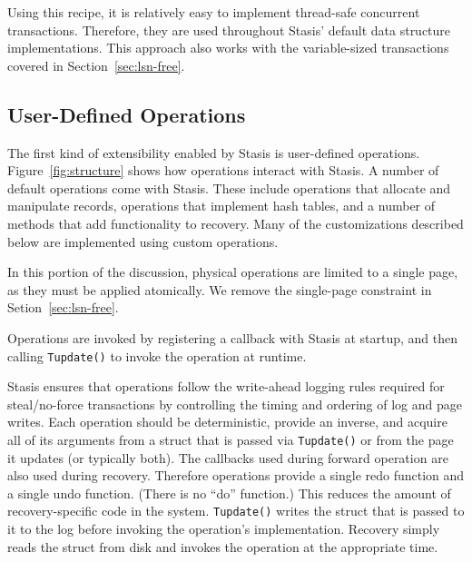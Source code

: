 \documentclass[letterpaper,twocolumn,10pt]{article}
\newcommand{\yad}{Stasis\xspace}
\newcommand{\yads}{Stasis'\xspace}
\begin{document}
Using this recipe, it is relatively easy to implement thread-safe
concurrent transactions.  Therefore, they are used throughout \yads
default data structure implementations.  This approach also works with the variable-sized transactions covered in Section~\ref{sec:lsn-free}.





\subsection{User-Defined Operations}

The first kind of extensibility enabled by \yad is user-defined operations.
Figure~\ref{fig:structure} shows how operations interact with \yad.  A
number of default operations come with \yad.  These include operations
that allocate and manipulate records, operations that implement hash
tables, and a number of methods that add functionality to recovery.
Many of the customizations described below are implemented using
custom operations. 

In this portion of the discussion, physical operations are limited to a single
page, as they must be applied atomically. We remove the single-page
constraint in Setion~\ref{sec:lsn-free}.

Operations are invoked by registering a callback with \yad at
startup, and then calling {\tt Tupdate()} to invoke the operation at
runtime.

 \yad ensures that operations follow the
write-ahead logging rules required for steal/no-force transactions by
controlling the timing and ordering of log and page writes.  Each
operation should be deterministic, provide an inverse, and acquire all
of its arguments from a struct that is passed via {\tt Tupdate()} or from
the page it updates (or typically both).  The callbacks used
during forward operation are also used during recovery.  Therefore
operations provide a single redo function and a single undo function.
(There is no ``do'' function.)  This reduces the amount of
recovery-specific code in the system.  {\tt Tupdate()} writes the struct
that is passed to it to the log before invoking the operation's
implementation.  Recovery simply reads the struct from disk and
invokes the operation at the appropriate time.
\end{document}

